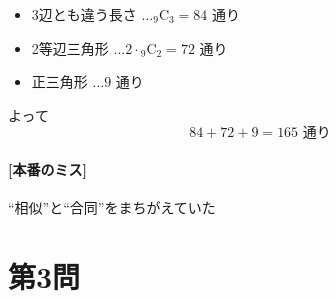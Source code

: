 \documentclass[../main.tex]{subfiles}
\begin{document}
\begin{itemize}
  \item[$1^\circ$] 3辺とも違う長さ $\dots {}_9\mathrm{C}_3 = 84$ 通り
  \item[$2^\circ$] 2等辺三角形 $\dots 2 \cdot {}_9\mathrm{C}_2 = 72$ 通り
  \item[$3^\circ$] 正三角形 $\dots 9$ 通り
\end{itemize}

よって
\[
  84 + 72 + 9 = 165 \text{ 通り}
\]

\paragraph*{[本番のミス]}
“相似”と“合同”をまちがえていた

\newpage

\section*{第3問}

\noindent
[\textbf{解}]
\end{document}
